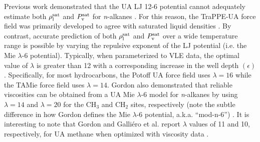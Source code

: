 \documentclass[journal=jctc,manuscript=article]{achemso}
\begin{document}
Previous work demonstrated that the UA LJ 12-6 potential cannot adequately estimate both $\rho_{\rm l}^{\rm sat}$ and $P_{\rm v}^{\rm sat}$ for \textit{n}-alkanes \cite{Pareto_LJPQ,Mess4}. For this reason, the TraPPE-UA force field was primarily developed to agree with saturated liquid densities \cite{TraPPE}. By contrast, accurate prediction of both $\rho_{\rm l}^{\rm sat}$ and $P_{\rm v}^{\rm sat}$ over a wide temperature range is possible by varying the repulsive exponent of the LJ potential (i.e. the Mie $\lambda$-6 potential). Typically, when parameterized to VLE data, the optimal value of $\lambda$ is greater than 12 with a corresponding increase in the well depth $(\epsilon)$. Specifically, for most hydrocarbons, the Potoff UA force field \cite{Mie,Potoff_branched} uses $\lambda = 16$ while the TAMie force field \cite{TAMie} uses $\lambda = 14$. Gordon also demonstrated that reliable viscosities can be obtained from a UA Mie $\lambda$-6 model for \textit{n}-alkanes by using $\lambda = 14$ and $\lambda = 20$ for the CH$_3$ and CH$_2$ sites, respectively (note the subtle difference in how Gordon defines the Mie $\lambda$-6 potential, a.k.a. ``mod-n-6'') \cite{Gordon2006}. 
It is interesting to note that Gordon and Galli{\'e}ro et al. report $\lambda$ values of 11 and 10, respectively, for UA methane when optimized with viscosity data \cite{Gordon2006,Galliero2005}.


\end{document}
